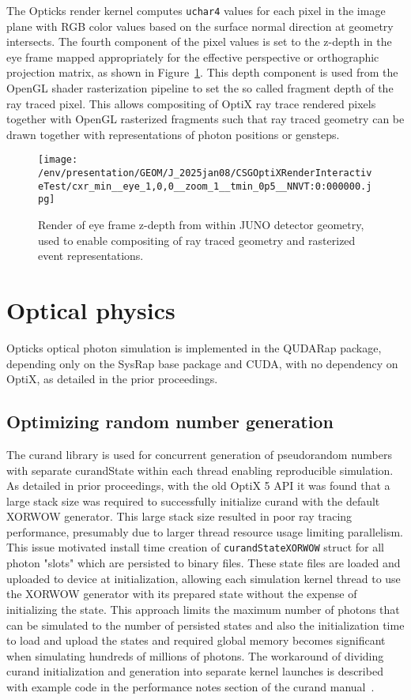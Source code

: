 \documentclass{webofc}
\begin{document}
The Opticks render kernel computes {\tt uchar4} values for each pixel in the image 
plane with RGB color values based on the surface normal direction at geometry intersects. 
The fourth component of the pixel values is set to the z-depth in the eye frame 
mapped appropriately for the effective perspective or orthographic projection matrix, 
as shown in Figure~\ref{depth}.  
This depth component is used from the OpenGL shader rasterization pipeline to set the 
so called fragment depth of the ray traced pixel. This allows compositing of OptiX ray 
trace rendered pixels together with OpenGL rasterized fragments such that 
ray traced geometry can be drawn together with representations of photon positions or gensteps.
%
%
\begin{figure}
\centering
\texttt{[image: /env/presentation/GEOM/J\_2025jan08/CSGOptiXRenderInteractiveTest/cxr\_min\_\_eye\_1,0,0\_\_zoom\_1\_\_tmin\_0p5\_\_NNVT:0:000000.jpg]}
\caption{Render of eye frame z-depth from within JUNO detector geometry, used to enable compositing of ray traced geometry and rasterized event representations.}  
\label{depth}
\vspace{-5mm}
\end{figure}%
%
% 
\section{Optical physics}%
%
Opticks optical photon simulation is implemented in the QUDARap package, 
depending only on the SysRap base package and CUDA, with no dependency on OptiX,
as detailed in the prior proceedings\cite{chep2023}.
%
\subsection{Optimizing random number generation}
\label{optrng} 
%
The curand library\cite{curand} is used for concurrent generation 
of pseudorandom numbers with separate curandState within each thread
enabling reproducible simulation.
As detailed in prior proceedings\cite{chep2016}, with the old OptiX 5 API
it was found that a large stack size was required to successfully initialize curand
with the default XORWOW generator. This large stack size resulted in poor ray tracing 
performance, presumably due to larger thread resource usage limiting parallelism.  
This issue motivated install time creation of {\tt curandStateXORWOW} struct 
for all photon "slots" which are persisted to binary files.  
These state files are loaded and uploaded to device at initialization,  
allowing each simulation kernel thread to use the XORWOW generator with its 
prepared state without the expense of initializing the state. 
This approach limits the maximum number of photons 
that can be simulated to the number of persisted states and also the initialization time 
to load and upload the states and required global memory becomes significant when simulating 
hundreds of millions of photons. 
The workaround of dividing curand initialization and generation into 
separate kernel launches is described with example code in the performance notes 
section of the curand manual~\cite{curand}. 
\end{document}
